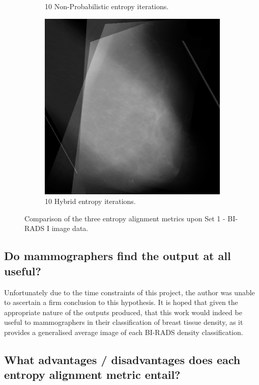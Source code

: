 \begin{figure}[H]
\begin{subfigure}[t]{0.3\textwidth}
        \caption{10 Non-Probabilistic entropy iterations.}
        \label{fig:nonProb-comp}
    \end{subfigure} \hfill
    \begin{subfigure}[t]{0.3\textwidth}
      \includegraphics[width=\textwidth]{Chapter3/hybrid-img/hybrid-10.png}
      \caption{10 Hybrid entropy iterations.}
      \label{fig:hybrid-comp}
    \end{subfigure}
    \caption{Comparison of the three entropy alignment metrics upon Set 1 - BI-RADS I image data.}
    \label{fig:comparison-of-techniques}
\end{figure}

\subsection{Do mammographers find the output at all useful?}

Unfortunately due to the time constraints of this project, the author was unable to ascertain a firm conclusion to this hypothesis. It is hoped that given the appropriate nature of the outputs produced, that this work would indeed be useful to mammographers in their classification of breast tissue density, as it provides a generalised average image of each BI-RADS density classification.

\subsection{What advantages / disadvantages does each entropy alignment metric entail?}

